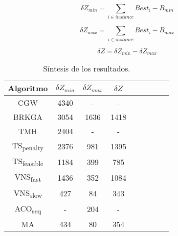 \bigskip

\begin{equation} \label{eq:zMin}
\delta Z_{min} = \sum_{i \in instance} Best_i - B_{min}
\end{equation}

\begin{equation} \label{eq:zMax}
\delta Z_{max} = \sum_{i \in instance} Best_i - B_{max}
\end{equation}

\begin{equation} \label{eq:DeltaZ}
\delta Z = \delta Z_{min} - \delta Z_{max}
\end{equation}

\bigskip

\begin{table}[!htbp]
\begin{center}
\begin{tabular}{ |c|c|c|c|c|c|c|c|c| } 
\hline
Algoritmo & $\delta Z_{min}$ & $\delta Z_{max}$ & $\delta Z$  \\
\hline
CGW & 4340 & - & -  \\
BRKGA & 3054 & 1636 & 1418  \\
TMH & 2404 & - & -  \\
TS\textsubscript{penalty} & 2376 & 981 & 1395  \\
TS\textsubscript{feasible} & 1184 & 399 & 785  \\
VNS\textsubscript{fast} & 1436 & 352 & 1084  \\
VNS\textsubscript{slow} & 427 & 84 & 343  \\
ACO\textsubscript{seq} & - & 204 & -  \\
MA & 434 & 80 & 354  \\
\hline
\end{tabular}
\end{center}
\caption{Síntesis de los resultados.}
\label{tab:resultadosSintesis}
\end{table}

\bigskip

